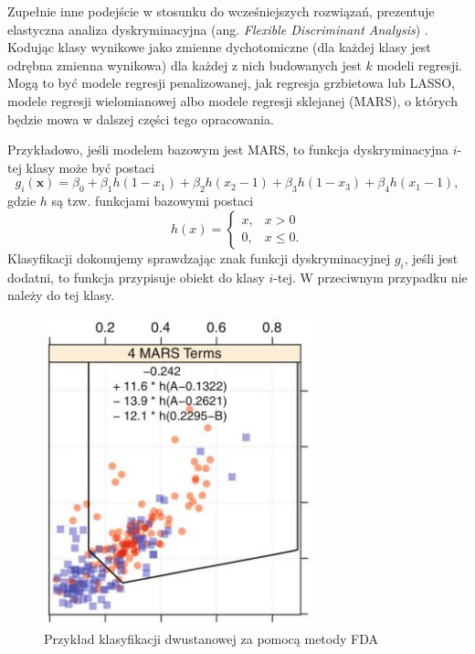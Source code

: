 \documentclass[
]{book}
\theoremstyle{plain}
\theoremstyle{definition}
\theoremstyle{definition}
\theoremstyle{definition}
\theoremstyle{definition}
\theoremstyle{definition}
\theoremstyle{remark}
\begin{document}
Zupełnie inne podejście w stosunku do wcześniejszych rozwiązań, prezentuje elastyczna analiza dyskryminacyjna (ang. \emph{Flexible Discriminant Analysis}) . Kodując klasy wynikowe jako zmienne dychotomiczne (dla każdej klasy jest odrębna zmienna wynikowa) dla każdej z nich budowanych jest \(k\) modeli regresji. Mogą to być modele regresji penalizowanej, jak regresja grzbietowa lub LASSO, modele regresji wielomianowej albo modele regresji sklejanej (MARS), o których będzie mowa w dalszej części tego opracowania.

Przykładowo, jeśli modelem bazowym jest MARS, to funkcja dyskryminacyjna \(i\)-tej klasy może być postaci
\begin{equation}
    g_i(\boldsymbol x)=\beta_0+\beta_1h(1-x_1)+\beta_2h(x_2-1)+\beta_3h(1-x_3)+\beta_4h(x_1-1),
\end{equation}
gdzie \(h\) są tzw. funkcjami bazowymi postaci
\begin{equation}
    h(x)= \begin{cases}
        x, & x> 0\\
        0, & x\leq 0.
    \end{cases}
\end{equation}
Klasyfikacji dokonujemy sprawdzając znak funkcji dyskryminacyjnej \(g_i\), jeśli jest dodatni, to funkcja przypisuje obiekt do klasy \(i\)-tej. W przeciwnym przypadku nie należy do tej klasy.

\begin{figure}

{\centering \includegraphics[width=3.09in]{images/fda} 

}

\caption{Przykład klasyfikacji dwustanowej za pomocą metody FDA}\label{fig:fda}
\end{figure}
\end{document}
